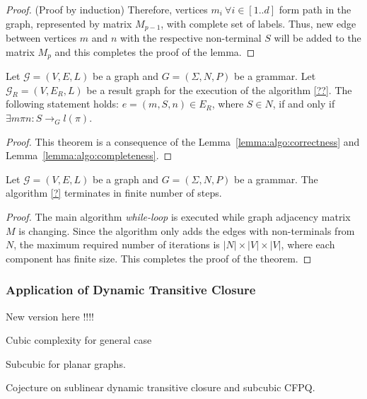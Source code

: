 \begin{proof}{(Proof by induction)}
    Therefore, vertices $m_i ~\forall i \in [1..d]$ form path in the graph, 
    represented by matrix $M_{p-1}$, with complete set of labels.
    Thus, new edge between vertices $m$ and $n$ with the respective 
    non-terminal $S$ will be added to the matrix $M_p$ and this completes 
    the proof of the lemma.

\end{proof}

\begin{theorem}
    Let $\mathcal{G} = (V,E,L)$ be a graph and  $G = (\Sigma, N, P)$ be a grammar.
    Let $\mathcal{G}_R = (V, E_R, L)$  be a result graph for the execution 
    of the algorithm \ref{??}. The following statement holds: 
    $e = (m, S, n) \in E_R$, where $S \in N$, if and only if 
    $\exists m \pi n: S \to_G l(\pi)$. 
\end{theorem}{}
    
\begin{proof}
    
    This theorem is a consequence of the  
    Lemma~\ref{lemma:algo:correctness} and 
    Lemma~\ref{lemma:algo:completeness}.
    
\end{proof}{}

\begin{theorem}{}
    Let $\mathcal{G} = (V,E,L)$ be a graph and $G = (\Sigma, N, P)$ be a grammar.
    The algorithm \ref{?} terminates in finite number of steps.
\end{theorem}

\begin{proof}
    
    The main algorithm \textit{while-loop} is executed while graph adjacency 
    matrix $M$ is changing. Since the algorithm only adds the edges with 
    non-terminals from $N$, the maximum required number of iterations 
    is $|N| \times |V| \times |V|$, where each component has finite size. 
    This completes the proof of the theorem.
    
\end{proof}{}


\subsubsection{Application of Dynamic Transitive Closure}

New version here !!!!

Cubic complexity for general case

Subcubic for planar graphs.

Cojecture on sublinear dynamic transitive closure and subcubic CFPQ.